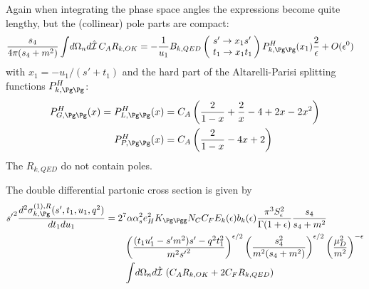 Again when integrating the phase space angles the expressions become quite lengthy, but the (collinear) pole parts are compact:
\begin{align}
\frac{s_4}{4\pi(s_4+m^2)}\int\!d\Omega_n d\hat{\mathcal I}\,C_A R_{k,OK} &=-\frac 1 {u_1}B_{k,QED}\left(\!\begin{array}{l}s'\rightarrow x_1s'\\t_1\rightarrow x_1 t_1\end{array}\!\!\right) P^H_{k,\Pg\Pg}(x_1)\frac 2 \epsilon + O(\epsilon^0)
\end{align}
with $x_1 = -u_1/(s'+t_1)$ and the hard part of the Altarelli-Parisi splitting functions $P^H_{k,\Pg\Pg}$\cite{Altarelli:1977zs,Vogelsang:1995vh}:
\begin{align}
P^H_{G,\Pg\Pg}(x) = P^H_{L,\Pg\Pg}(x) &= C_A\left(\frac 2 {1-x} + \frac 2 x - 4 + 2x - 2x^2\right)\\
P^H_{P,\Pg\Pg}(x) &= C_A\left(\frac 2 {1-x} - 4x + 2\right)
\end{align}
The $R_{k,QED}$ do not contain poles.

The double differential partonic cross section is given by
\begin{align}
{s'}^2\frac{d^2\sigma_{k,\Pg}^{(1),R}(s',t_1,u_1,q^2)}{dt_1du_1} &= 2^7\alpha\alpha_s^2 e_H^2 K_{\Pg\Pgg}N_CC_F E_k(\epsilon) b_k(\epsilon)\frac{\pi^3 S_\epsilon^2}{\Gamma(1+\epsilon)} \frac{s_4}{s_4+m^2}  \nonumber\\
 &\hspace{20pt} \left(\frac{(t_1u_1'-s'm^2)s' - q^2t_1^2}{m^2{s'}^2}\right)^{\epsilon/2} \left(\frac{s_4^2}{m^2(s_4+m^2)}\right)^{\epsilon/2} \left(\frac{\mu_D^2}{m^2}\right)^{-\epsilon} \nonumber\\
 &\hspace{20pt} \int\!d\Omega_n d\hat{\mathcal I}\,\left(C_A R_{k,OK} + 2C_F R_{k,QED}\right)
\end{align}

